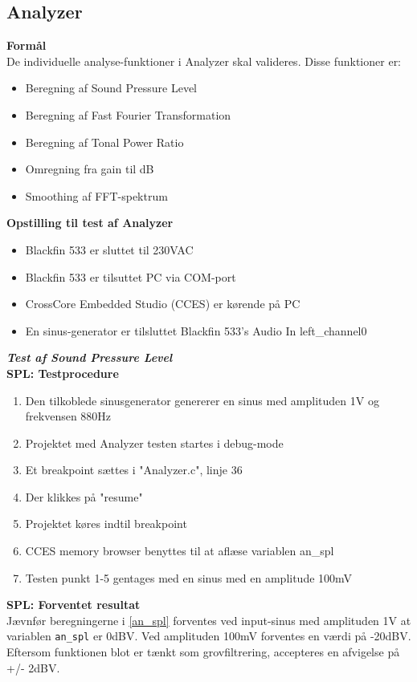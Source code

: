 \subsection*{Analyzer}

\textbf{Formål} \\
De individuelle analyse-funktioner i Analyzer skal valideres. Disse funktioner er:
\begin{itemize}
	\item Beregning af Sound Pressure Level
	\item Beregning af Fast Fourier Transformation
	\item Beregning af Tonal Power Ratio
	\item Omregning fra gain til dB
	\item Smoothing af FFT-spektrum
\end{itemize}

\textbf{Opstilling til test af Analyzer}
\begin{itemize}
	\item Blackfin 533 er sluttet til 230VAC
	\item Blackfin 533 er tilsuttet PC via COM-port
	\item CrossCore Embedded Studio (CCES) er kørende på PC
	\item En sinus-generator er tilsluttet Blackfin 533's Audio In left\_channel0
\end{itemize}

\textbf{\textit{Test af Sound Pressure Level}}\\
\textbf{SPL: Testprocedure}
\begin{enumerate}
	\item Den tilkoblede sinusgenerator genererer en sinus med amplituden 1V og frekvensen 880Hz	
	\item Projektet med Analyzer testen startes i debug-mode
	\item Et breakpoint sættes i "Analyzer.c", linje 36 
	\item Der klikkes på "resume"
	\item Projektet køres indtil breakpoint
	\item CCES memory browser benyttes til at aflæse variablen an\_spl 
	\item Testen punkt 1-5 gentages med en sinus med en amplitude 100mV
\end{enumerate}

\textbf{SPL: Forventet resultat} \\
Jævnfør beregningerne i \ref{an_spl} forventes ved input-sinus med amplituden 1V at variablen \verb+an_spl+ er 0dBV. Ved amplituden 100mV forventes en værdi på -20dBV. Eftersom funktionen blot er tænkt som grovfiltrering, accepteres en afvigelse på +/- 2dBV.

